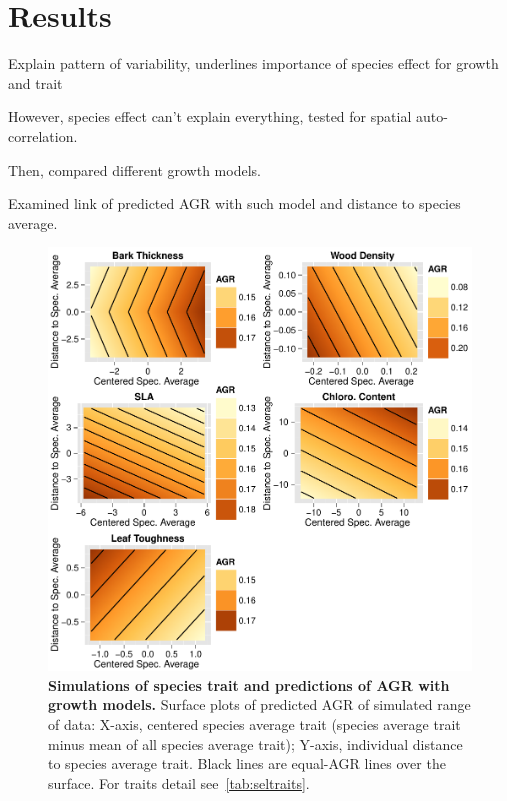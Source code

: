 \label{sec:Res}
\section*{Results}

Explain pattern of variability, underlines importance of species effect for growth and trait \missfig

However, species effect can't explain everything, tested for spatial auto-correlation.

Then, compared different growth models.

Examined link of predicted AGR with such model and distance to species average.

\begin{figure}[h!]
	\centering
	\includegraphics{figures/Sel_Traits_Simul_Pred_AGR_2015-05-22.pdf}
	\caption{\textbf{Simulations of species trait and predictions of AGR with growth models.} Surface plots of predicted AGR of simulated range of data: X-axis, centered species average trait (species average trait minus mean of all species average trait); Y-axis, individual distance to species average trait. Black lines are equal-AGR lines over the surface. For traits detail see~\autoref{tab:seltraits}.}
	\label{fig:simul}
\end{figure}